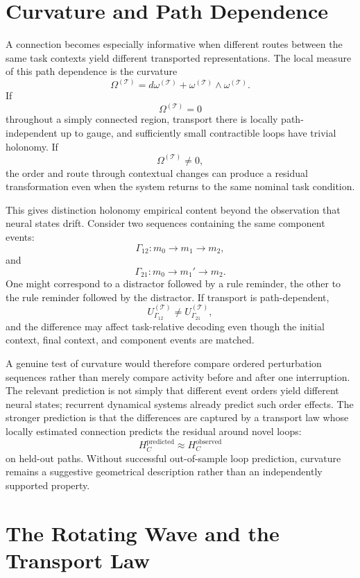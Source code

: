 \documentclass[11pt]{book}
\begin{document}
\section*{Curvature and Path Dependence}

A connection becomes especially informative when different routes between the same task contexts yield different transported representations. The local measure of this path dependence is the curvature
\[
\Omega^{(\mathcal T)}
=
d\omega^{(\mathcal T)}
+
\omega^{(\mathcal T)}
\wedge
\omega^{(\mathcal T)}.
\]
If
\[
\Omega^{(\mathcal T)}=0
\]
throughout a simply connected region, transport there is locally path-independent up to gauge, and sufficiently small contractible loops have trivial holonomy. If
\[
\Omega^{(\mathcal T)}\neq 0,
\]
the order and route through contextual changes can produce a residual transformation even when the system returns to the same nominal task condition.

This gives distinction holonomy empirical content beyond the observation that neural states drift. Consider two sequences containing the same component events:
\[
\Gamma_{12}:
m_0\rightarrow m_1\rightarrow m_2,
\]
and
\[
\Gamma_{21}:
m_0\rightarrow m_1'\rightarrow m_2.
\]
One might correspond to a distractor followed by a rule reminder, the other to the rule reminder followed by the distractor. If transport is path-dependent,
\[
U_{\Gamma_{12}}^{(\mathcal T)}
\neq
U_{\Gamma_{21}}^{(\mathcal T)},
\]
and the difference may affect task-relative decoding even though the initial context, final context, and component events are matched.

A genuine test of curvature would therefore compare ordered perturbation sequences rather than merely compare activity before and after one interruption. The relevant prediction is not simply that different event orders yield different neural states; recurrent dynamical systems already predict such order effects. The stronger prediction is that the differences are captured by a transport law whose locally estimated connection predicts the residual around novel loops:
\[
H_C^{\mathrm{predicted}}
\approx
H_C^{\mathrm{observed}}
\]
on held-out paths. Without successful out-of-sample loop prediction, curvature remains a suggestive geometrical description rather than an independently supported property.

\section*{The Rotating Wave and the Transport Law}
\end{document}
